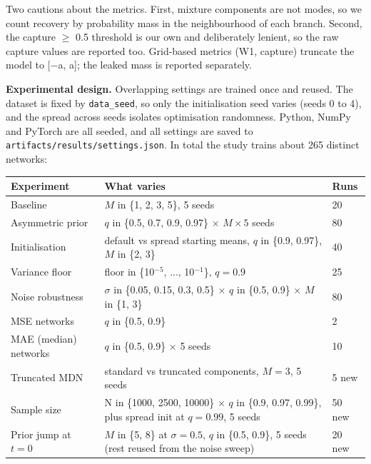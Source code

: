 \documentclass[11pt,a4paper]{article}
\begin{document}
Two cautions about the metrics. First, mixture components are not modes, so we count recovery by probability mass in the neighbourhood of each branch. Second, the capture $\ge$ 0.5 threshold is our own and deliberately lenient, so the raw capture values are reported too. Grid-based metrics (W1, capture) truncate the model to [$-$a, a]; the leaked mass is reported separately.

\textbf{Experimental design.} Overlapping settings are trained once and reused. The dataset is fixed by \texttt{data\_\allowbreak{}seed}, so only the initialisation seed varies (seeds 0 to 4), and the spread across seeds isolates optimisation randomness. Python, NumPy and PyTorch are all seeded, and all settings are saved to \texttt{artifacts/\allowbreak{}results/\allowbreak{}settings.json}. In total the study trains about 265 distinct networks:

\begin{table}[H]
\centering\small
\begin{tabularx}{\linewidth}{l>{\raggedright\arraybackslash}Xl}
\toprule
\textbf{Experiment} & \textbf{What varies} & \textbf{Runs} \\
\midrule
Baseline & $M$ in \{1, 2, 3, 5\}, 5 seeds & 20 \\
Asymmetric prior & $q$ in \{0.5, 0.7, 0.9, 0.97\} $\times$ $M \times  5$ seeds & 80 \\
Initialisation & default vs spread starting means, $q$ in \{0.9, 0.97\}, $M$ in \{2, 3\} & 40 \\
Variance floor & floor in \{10$^{-5}$, ..., 10$^{-1}$\}, $q = 0.9$ & 25 \\
Noise robustness & $\sigma$ in \{0.05, 0.15, 0.3, 0.5\} $\times$ $q$ in \{0.5, 0.9\} $\times$ $M$ in \{1, 3\} & 80 \\
MSE networks & $q$ in \{0.5, 0.9\} & 2 \\
MAE (median) networks & $q$ in \{0.5, 0.9\} $\times$ 5 seeds & 10 \\
Truncated MDN & standard vs truncated components, $M = 3$, 5 seeds & 5 new \\
Sample size & N in \{1000, 2500, 10000\} $\times$ $q$ in \{0.9, 0.97, 0.99\}, plus spread init at $q = 0.99$, 5 seeds & 50 new \\
Prior jump at $t = 0$ & $M$ in \{5, 8\} at $\sigma  = 0.5$, $q$ in \{0.5, 0.9\}, 5 seeds (rest reused from the noise sweep) & 20 new \\
\bottomrule
\end{tabularx}
\end{table}
\end{document}
